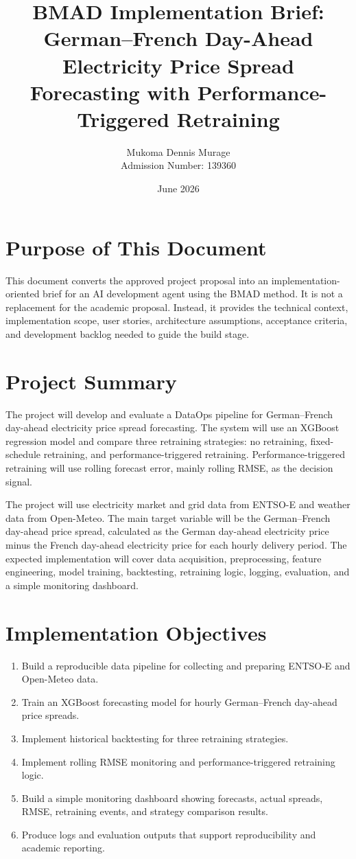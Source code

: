 \documentclass[12pt,a4paper]{article}
\title{BMAD Implementation Brief: German--French Day-Ahead Electricity Price Spread Forecasting with Performance-Triggered Retraining}
\author{Mukoma Dennis Murage \\ Admission Number: 139360}
\date{June 2026}
\begin{document}
\maketitle

\section{Purpose of This Document}

This document converts the approved project proposal into an implementation-oriented brief for an AI development agent using the BMAD method. It is not a replacement for the academic proposal. Instead, it provides the technical context, implementation scope, user stories, architecture assumptions, acceptance criteria, and development backlog needed to guide the build stage.

\section{Project Summary}

The project will develop and evaluate a DataOps pipeline for German--French day-ahead electricity price spread forecasting. The system will use an XGBoost regression model and compare three retraining strategies: no retraining, fixed-schedule retraining, and performance-triggered retraining. Performance-triggered retraining will use rolling forecast error, mainly rolling RMSE, as the decision signal.

The project will use electricity market and grid data from ENTSO-E and weather data from Open-Meteo. The main target variable will be the German--French day-ahead price spread, calculated as the German day-ahead electricity price minus the French day-ahead electricity price for each hourly delivery period. The expected implementation will cover data acquisition, preprocessing, feature engineering, model training, backtesting, retraining logic, logging, evaluation, and a simple monitoring dashboard.

\section{Implementation Objectives}

\begin{enumerate}
    \item Build a reproducible data pipeline for collecting and preparing ENTSO-E and Open-Meteo data.
    \item Train an XGBoost forecasting model for hourly German--French day-ahead price spreads.
    \item Implement historical backtesting for three retraining strategies.
    \item Implement rolling RMSE monitoring and performance-triggered retraining logic.
    \item Build a simple monitoring dashboard showing forecasts, actual spreads, RMSE, retraining events, and strategy comparison results.
    \item Produce logs and evaluation outputs that support reproducibility and academic reporting.
\end{enumerate}
\end{document}
